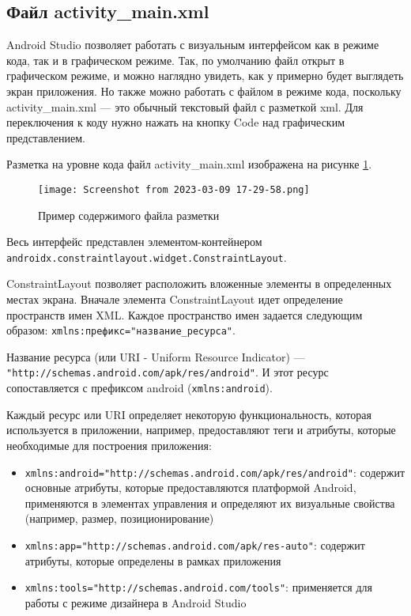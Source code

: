 \subsection{Файл activity\_main.xml}
Android Studio позволяет работать с визуальным интерфейсом как в режиме
кода, так и в графическом режиме. Так, по умолчанию файл открыт в
графическом режиме, и можно наглядно увидеть, как у примерно
будет выглядеть экран приложения.
Но также можно работать с файлом в режиме кода, поскольку
activity\_main.xml --- это обычный текстовый файл с разметкой xml. Для
переключения к коду нужно нажать на кнопку Code над графическим
представлением.\par
Разметка на уровне кода файл activity\_main.xml изображена
на рисунке \ref{fig:xml:layout}.

\begin{figure}[h!tp]
	\centering
	\texttt{[image: Screenshot from 2023-03-09 17-29-58.png]}
	\caption{Пример содержимого файла разметки}
	\label{fig:xml:layout}
\end{figure}

Весь интерфейс представлен элементом-контейнером
\texttt{androidx.constraintlayout.widget.ConstraintLayout}.\par
ConstraintLayout позволяет расположить вложенные элементы в
определенных местах экрана. Вначале элемента ConstraintLayout идет
определение пространств имен XML.
Каждое пространство имен задается следующим образом:
\texttt{xmlns:префикс="название\_ресурса"}.\par
Название ресурса (или URI - Uniform Resource Indicator) ---
\texttt{"http://schemas.android.com/apk/res/android"}.
И этот ресурс сопоставляется с префиксом android (\texttt{xmlns:android}).\par
Каждый ресурс или URI определяет некоторую функциональность,
которая используется в приложении, например, предоставляют теги и атрибуты,
которые необходимые для построения приложения:
\begin{itemize}
	\item \texttt{xmlns:android="http://schemas.android.com/apk/res/android"}:
		содержит основные атрибуты, которые предоставляются платформой
		Android, применяются в элементах управления и определяют
		их визуальные свойства (например, размер, позиционирование)
	\item \texttt{xmlns:app="http://schemas.android.com/apk/res-auto"}:
		содержит атрибуты, которые определены в рамках приложения
	\item \texttt{xmlns:tools="http://schemas.android.com/tools"}:
		применяется для работы с режиме дизайнера в Android Studio
\end{itemize}

